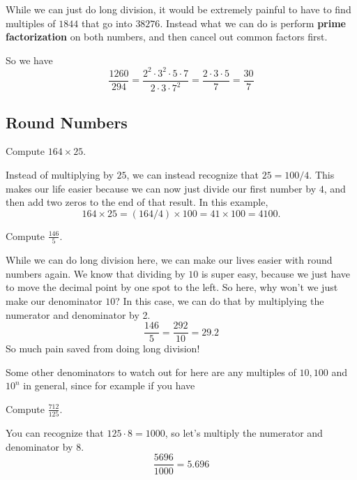 While we can just do long division, it would be extremely painful to have to find multiples of $1844$ that go into $38276$.
Instead what we can do is perform \textbf{prime factorization} on both numbers, and then cancel out common factors first.

So we have
\begin{equation*}
  \frac{1260}{294} = \frac{
    2^2 \cdot 3^2 \cdot 5 \cdot 7
  }{
    2 \cdot 3 \cdot 7^2
  } = \frac{2 \cdot 3 \cdot 5}{7} = \frac{30}{7}
\end{equation*}

\subsection{Round Numbers}

\begin{example}
  Compute $164 \times 25$.
\end{example}

Instead of multiplying by $25$, we can instead recognize that $25 = 100/4$. This makes our life easier because we can now just divide our first number by $4$, and then add two zeros to the end of that result.
In this example,
\begin{equation*}
  164 \times 25 = (164 /4) \times 100 = 41 \times 100 = 4100.
\end{equation*}

\begin{example}
  Compute $\frac{146}{5}$.
\end{example}

While we can do long division here, we can make our lives easier with round numbers again. We know that dividing by $10$ is super easy, because we just have to move the decimal point by one spot to the left.
So here, why won't we just make our denominator $10$? In this case, we can do that by multiplying the numerator and denominator by 2.
\begin{equation*}
  \frac{146}{5} = \frac{292}{10} = 29.2
\end{equation*}
So much pain saved from doing long division!

Some other denominators to watch out for here are any multiples of $10, 100$ and $10^n$ in general, since for example if you have
\begin{example}
  Compute $\frac{712}{125}$.
\end{example}
You can recognize that $125 \cdot 8 = 1000$, so let's multiply the numerator and denominator by 8.
\begin{equation*}
  \frac{5696}{1000} = 5.696
\end{equation*}

